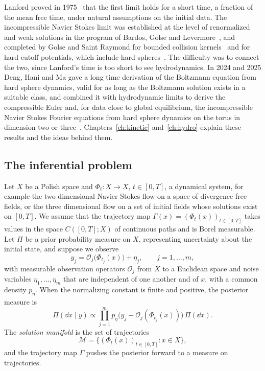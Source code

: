 Lanford proved in 1975~\cite{lanford1975} that the first limit holds for a short time, a fraction of the mean free time, under natural assumptions on the initial data. The incompressible Navier Stokes limit was established at the level of renormalized and weak solutions in the program of Bardos, Golse and Levermore~\cite{bgl1991,bgl1993}, and completed by Golse and Saint Raymond for bounded collision kernels~\cite{golsesaintraymond2004} and for hard cutoff potentials, which include hard spheres~\cite{golsesaintraymond2009}. The difficulty was to connect the two, since Lanford's time is too short to see hydrodynamics. In 2024 and 2025 Deng, Hani and Ma gave a long time derivation of the Boltzmann equation from hard sphere dynamics, valid for as long as the Boltzmann solution exists in a suitable class, and combined it with hydrodynamic limits to derive the compressible Euler and, for data close to global equilibrium, the incompressible Navier Stokes Fourier equations from hard sphere dynamics on the torus in dimension two or three~\cite{denghanima2024,denghanima2025}. Chapters~\ref{ch:kinetic} and~\ref{ch:hydro} explain these results and the ideas behind them.

\subsection{The inferential problem}

Let $X$ be a Polish space and $\Phi_t:X\to X$, $t\in[0,T]$, a dynamical system, for example the two dimensional Navier Stokes flow on a space of divergence free fields, or the three dimensional flow on a set of initial fields whose solutions exist on $[0,T]$. We assume that the trajectory map $\Gamma(x) = (\Phi_t(x))_{t\in[0,T]}$ takes values in the space $C([0,T];X)$ of continuous paths and is Borel measurable. Let $\Pi$ be a prior probability measure on $X$, representing uncertainty about the initial state, and suppose we observe
\begin{equation}
y_j = \mathcal{O}_j\big(\Phi_{t_j}(x)\big) + \eta_j,\qquad j=1,\dots,m,
\label{eq:observation_model}
\end{equation}
with measurable observation operators $\mathcal{O}_j$ from $X$ to a Euclidean space and noise variables $\eta_1,\dots,\eta_m$ that are independent of one another and of $x$, with a common density $p_\eta$. When the normalizing constant is finite and positive, the posterior measure is
\[
\Pi(\dd x\mid y) \propto \prod_{j=1}^m p_\eta\big(y_j - \mathcal{O}_j(\Phi_{t_j}(x))\big)\,\Pi(\dd x).
\]
The \emph{solution manifold} is the set of trajectories
\[
\mathcal{M} = \big\{ (\Phi_t(x))_{t\in[0,T]} : x\in X \big\},
\]
and the trajectory map $\Gamma$ pushes the posterior forward to a measure on trajectories.

